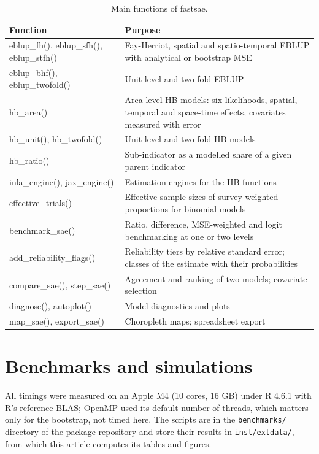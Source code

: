 \begin{table}[!h]
\centering
\caption{\label{tab:functions}Main functions of fastsae.}
\centering
\begin{tabular}[t]{>{\raggedright\arraybackslash}p{5.5cm}>{\raggedright\arraybackslash}p{8.5cm}}
\toprule
Function & Purpose\\
\midrule
eblup\_fh(), eblup\_sfh(), eblup\_stfh() & Fay-Herriot, spatial and spatio-temporal EBLUP with analytical or bootstrap MSE\\
eblup\_bhf(), eblup\_twofold() & Unit-level and two-fold EBLUP\\
hb\_area() & Area-level HB models: six likelihoods, spatial, temporal and space-time effects, covariates measured with error\\
hb\_unit(), hb\_twofold() & Unit-level and two-fold HB models\\
hb\_ratio() & Sub-indicator as a modelled share of a given parent indicator\\
inla\_engine(), jax\_engine() & Estimation engines for the HB functions\\
effective\_trials() & Effective sample sizes of survey-weighted proportions for binomial models\\
benchmark\_sae() & Ratio, difference, MSE-weighted and logit benchmarking at one or two levels\\
add\_reliability\_flags() & Reliability tiers by relative standard error; classes of the estimate with their probabilities\\
compare\_sae(), step\_sae() & Agreement and ranking of two models; covariate selection\\
diagnose(), autoplot() & Model diagnostics and plots\\
map\_sae(), export\_sae() & Choropleth maps; spreadsheet export\\
\bottomrule
\end{tabular}
\end{table}

\section{Benchmarks and simulations}\label{sec:simulations}

All timings were measured on an Apple M4 (10 cores, 16 GB) under R 4.6.1 with R's reference BLAS; OpenMP used its default number of threads, which matters only for the bootstrap, not timed here. The scripts are in the \texttt{benchmarks/} directory of the package repository and store their results in \texttt{inst/extdata/}, from which this article computes its tables and figures.

